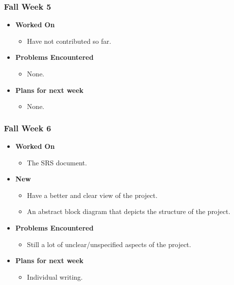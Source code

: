 \documentclass{article}
\begin{document}
\subsubsection{Fall Week 5}
\begin{itemize}
    \item {\textbf{Worked On}}
    \begin{itemize}
      \item Have not contributed so far.
    \end{itemize}

    \item {\textbf{Problems Encountered}}
    \begin{itemize}
      \item None.
    \end{itemize}

    \item{\textbf{Plans for next week}}
    \begin{itemize}
      \item None.
    \end{itemize}

\end{itemize}

\subsubsection{Fall Week 6}
\begin{itemize}
    \item {\textbf{Worked On}}
    \begin{itemize}
      \item The SRS document.
    \end{itemize}

    \item {\textbf{New}}
    \begin{itemize}
      \item Have a better and clear view of the project.
      \item An abstract block diagram that depicts the structure of the project.
    \end{itemize}

    \item {\textbf{Problems Encountered}}
    \begin{itemize}
      \item Still a lot of unclear/unspecified aspects of the project.
    \end{itemize}

    \item{\textbf{Plans for next week}}
    \begin{itemize}
      \item Individual writing.
    \end{itemize}

\end{itemize}
\end{document}
